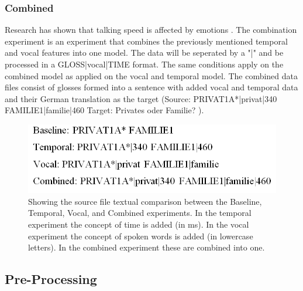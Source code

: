 \subsubsection{Combined}

Research has shown that talking speed is affected by emotions \cite{kshirsagar2002multilayer}. The combination experiment is an experiment that combines the previously mentioned temporal and vocal features into one model.  The data will be seperated by a "|" and be processed in a GLOSS|vocal|TIME format. The same conditions apply on the combined model as applied on the vocal and temporal model. The combined data files consist of glosses formed into a sentence with added vocal and temporal data and their German translation as the target (Source: PRIVAT1A*|privat|340 FAMILIE1|familie|460 Target: Privates oder Familie? \cite{dgscorpus_3}).

\begin{figure}[h]
\caption{Showing the source file textual comparison between the Baseline, Temporal, Vocal, and Combined experiments. In the temporal experiment the concept of time is added (in ms). In the vocal experiment the concept of spoken words is added (in lowercase letters). In the combined experiment these are combined into one.}
 \centering 
 \includegraphics[width=14cm]{Bachelor CSAI thesis template/images/baseline_compared.PNG}
 
 \label{fig:baseline_comparison}
\end{figure}


\subsection{Pre-Processing}

